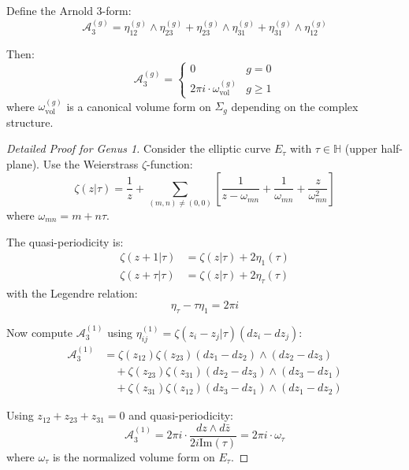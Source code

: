 \begin{theorem}
\label{thm:quantum-arnold-relations}
Define the Arnold 3-form:
\begin{equation}
\mathcal{A}_3^{(g)} = \eta_{12}^{(g)} \wedge \eta_{23}^{(g)} + \eta_{23}^{(g)} \wedge \eta_{31}^{(g)} + \eta_{31}^{(g)} \wedge \eta_{12}^{(g)}
\end{equation}

Then:
\begin{equation}
\mathcal{A}_3^{(g)} = \begin{cases}
0 & g = 0 \\
2\pi i \cdot \omega_{\text{vol}}^{(g)} & g \geq 1
\end{cases}
\end{equation}
where $\omega_{\text{vol}}^{(g)}$ is a canonical volume form on $\Sigma_g$ depending on the complex structure.
\end{theorem}

\begin{proof}[Detailed Proof for Genus 1]
Consider the elliptic curve $E_\tau$ with $\tau \in \mathbb{H}$ (upper half-plane). Use the Weierstrass $\zeta$-function:
\begin{equation}
\zeta(z|\tau) = \frac{1}{z} + \sum_{(m,n) \neq (0,0)} \left[\frac{1}{z - \omega_{mn}} + \frac{1}{\omega_{mn}} + \frac{z}{\omega_{mn}^2}\right]
\end{equation}
where $\omega_{mn} = m + n\tau$.

The quasi-periodicity is:
\begin{align}
\zeta(z + 1|\tau) &= \zeta(z|\tau) + 2\eta_1(\tau)\\
\zeta(z + \tau|\tau) &= \zeta(z|\tau) + 2\eta_\tau(\tau)
\end{align}
with the Legendre relation:
\begin{equation}
\eta_\tau - \tau \eta_1 = 2\pi i
\end{equation}

Now compute $\mathcal{A}_3^{(1)}$ using $\eta_{ij}^{(1)} = \zeta(z_i - z_j|\tau)(dz_i - dz_j)$:
\begin{align}
\mathcal{A}_3^{(1)} &= \zeta(z_{12})\zeta(z_{23})(dz_1 - dz_2) \wedge (dz_2 - dz_3)\\
&\quad + \zeta(z_{23})\zeta(z_{31})(dz_2 - dz_3) \wedge (dz_3 - dz_1)\\
&\quad + \zeta(z_{31})\zeta(z_{12})(dz_3 - dz_1) \wedge (dz_1 - dz_2)
\end{align}

Using $z_{12} + z_{23} + z_{31} = 0$ and quasi-periodicity:
\begin{equation}
\mathcal{A}_3^{(1)} = 2\pi i \cdot \frac{dz \wedge d\bar{z}}{2i \text{Im}(\tau)} = 2\pi i \cdot \omega_\tau
\end{equation}
where $\omega_\tau$ is the normalized volume form on $E_\tau$.
\end{proof}

